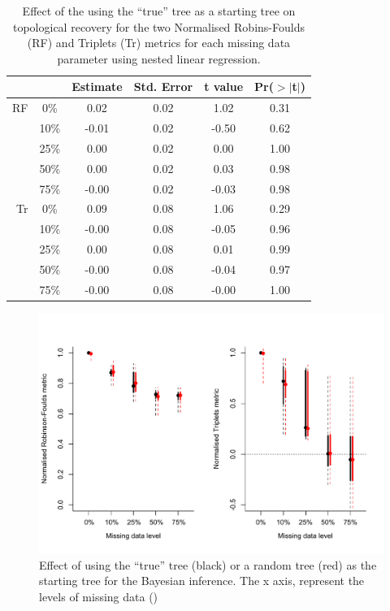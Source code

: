 \documentclass[12pt,letterpaper]{article}
\begin{document}
\begin{table}[ht]
\caption{Effect of the using the ``true'' tree as a starting tree on topological recovery for the two Normalised Robins-Foulds (RF) and Triplets (Tr) metrics for each missing data parameter using nested linear regression.}
\label{Tab_lmList_res}
\centering
\begin{tabular}{rccccc}
  \hline
 & & Estimate & Std. Error & t value & Pr($>$$|$t$|$) \\ 
  \hline
RF & 0\%  & 0.02 & 0.02 & 1.02 & 0.31 \\ 
   & 10\% & -0.01 & 0.02 & -0.50 & 0.62 \\ 
   & 25\% & 0.00 & 0.02 & 0.00 & 1.00 \\ 
   & 50\% & 0.00 & 0.02 & 0.03 & 0.98 \\ 
   & 75\% & -0.00 & 0.02 & -0.03 & 0.98 \\
Tr & 0\%  & 0.09 & 0.08 & 1.06 & 0.29 \\ 
   & 10\% & -0.00 & 0.08 & -0.05 & 0.96 \\ 
   & 25\% & 0.00 & 0.08 & 0.01 & 0.99 \\ 
   & 50\% & -0.00 & 0.08 & -0.04 & 0.97 \\ 
   & 75\% & -0.00 & 0.08 & -0.00 & 1.00 \\ 
   \hline
\end{tabular}
\end{table}

\begin{figure}
\centering
\includegraphics[keepaspectratio=true, width=\textwidth]{SupplementaryFigures/Starting_tree.pdf}
\caption{Effect of using the ``true'' tree (black) or a random tree (red) as the starting tree for the Bayesian inference. The x axis, represent the levels of missing data ()}
\label{Fig_startingTree}
\end{figure}
\end{document}
